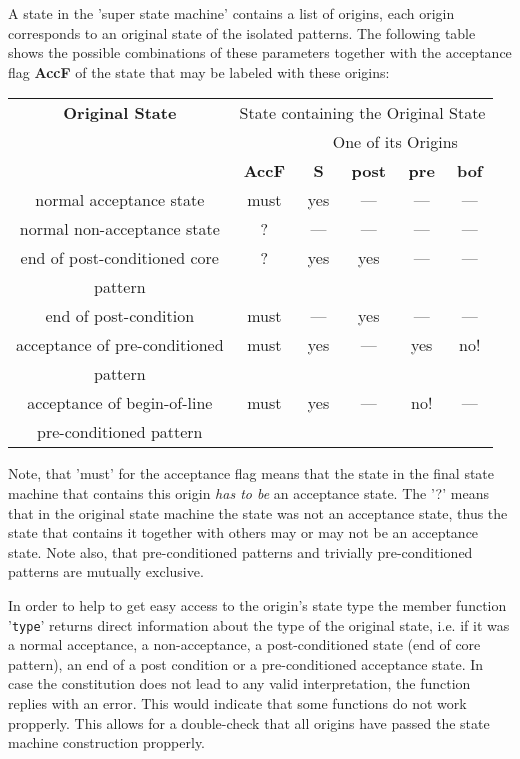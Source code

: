 A state in the 'super state machine' contains a list of origins, each origin
corresponds to an original state of the isolated patterns.  The following table
shows the possible combinations of these parameters together with the
acceptance flag {\bf AccF} of the state that may be labeled with these origins:

\begin{center}
\begin{tabular}{c|c|c|c|c|c|}
{\bf Original State}          & \multicolumn{5}{c|}{State containing the Original State}  \\
	                      &            & \multicolumn{4}{c|}{One of its Origins}      \\ \hline
                              & {\bf AccF} & {\bf S} & {\bf post} & {\bf pre} & {\bf bof} \\ \hline \hline
normal acceptance state       & must       & yes     & ---        & ---       & --- \\ \hline
normal non-acceptance state   &  ?         & ---     & ---        & ---       & --- \\ \hline
end of post-conditioned core  &  ?         & yes     & yes        & ---       & --- \\ 
pattern                       &            &         &            &           &     \\ \hline
end of post-condition         & must       & ---     & yes        & ---       & --- \\ \hline
acceptance of pre-conditioned & must       & yes     & ---        & yes       & no! \\
pattern                       &            &         &            &           &     \\ \hline
acceptance of begin-of-line   & must       & yes     & ---        & no!       & --- \\
pre-conditioned pattern       &            &         &            &           &     \\ \hline
\end{tabular}
\end{center}

Note, that 'must' for the acceptance flag means that the state in the final
state machine that contains this origin {\it has to be} an acceptance state.
The '?' means that in the original state machine the state was not an
acceptance state, thus the state that contains it together with others may or
may not be an acceptance state. Note also, that pre-conditioned patterns
and trivially pre-conditioned patterns are mutually exclusive. 

In order to help to get easy access to the origin's state type the member
function '{\tt type}' returns direct information about the type of the original
state, i.e. if it was a normal acceptance, a non-acceptance, a post-conditioned
state (end of core pattern), an end of a post condition or a pre-conditioned
acceptance state. In case the constitution does not lead to any valid
interpretation, the function replies with an error. This would indicate that
some functions do not work propperly. This allows for a double-check that
all origins have passed the state machine construction propperly.
    


